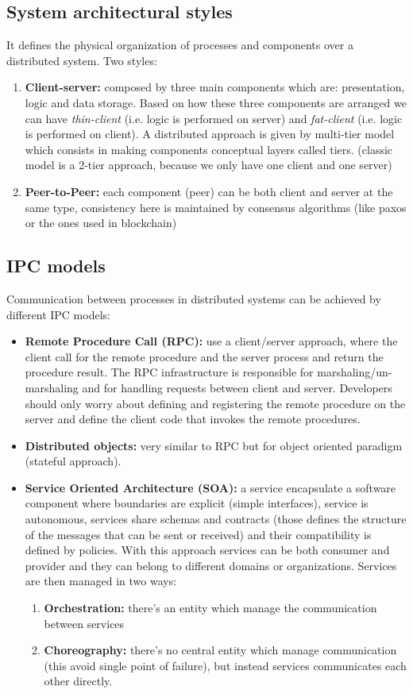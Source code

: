 \documentclass{article}
\begin{document}
\subsection{System architectural styles}
It defines the physical organization of processes and components over a distributed system. Two styles:
\begin{enumerate}
    \item \textbf{Client-server:} composed by three main components which are: presentation, logic and data storage. Based on how these three components are arranged we can have \textit{thin-client} (i.e. logic is performed on server) and \textit{fat-client} (i.e. logic is performed on client). A distributed approach is given by multi-tier model which consists in making components conceptual layers called tiers. (classic model is a 2-tier approach, because we only have one client and one server)
    \item \textbf{Peer-to-Peer:} each component (peer) can be both client and server at the same type, consistency here is maintained by consensus algorithms (like paxos or the ones used in blockchain)
\end{enumerate}
\subsection{IPC models}
Communication between processes in distributed systems can be achieved by different IPC models:
\begin{itemize}
    \item \textbf{Remote Procedure Call (RPC):} use a client/server approach, where the client call for the remote procedure and the server process and return the procedure result. The RPC infrastructure is responsible for marshaling/un-marshaling and for handling requests between client and server. Developers should only worry about defining and registering the remote procedure on the server and define the client code that invokes the remote procedures.
    \item \textbf{Distributed objects:} very similar to RPC but for object oriented paradigm (stateful approach).
    \item \textbf{Service Oriented Architecture (SOA):} a service encapsulate a software component where boundaries are explicit (simple interfaces), service is autonomous, services share schemas and contracts (those defines the structure of the messages that can be sent or received) and their compatibility is defined by policies. With this approach services can be both consumer and provider and they can belong to different domains or organizations. Services are then managed in two ways:
    \begin{enumerate}
        \item \textbf{Orchestration:} there's an entity which manage the communication between services
        \item \textbf{Choreography:} there's no central entity which manage communication (this avoid single point of failure), but instead services communicates each other directly.
    \end{enumerate}
\end{itemize}
\end{document}

